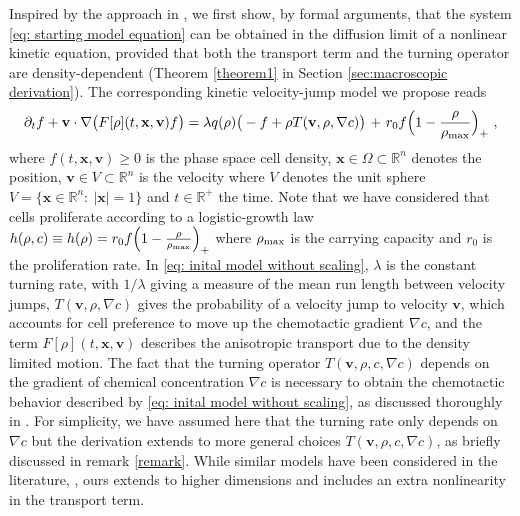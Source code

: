 \documentclass{aims} %
\theoremstyle{definition}
\begin{document}
{Inspired by the approach in \cite{othmer2000diffusion,othmer2002diffusion}, we first show, by formal arguments, that the system \eqref{eq: starting model equation} can be obtained in the diffusion limit of a nonlinear kinetic equation, provided that both the transport term and the turning operator are density-dependent { (Theorem \ref{theorem1} in Section \ref{sec:macroscopic derivation})}. The corresponding kinetic velocity-jump model we propose reads 
\begin{equation}
    \partial_t f+\mathbf{v}\cdot \nabla \big(F[\rho](t,\mathbf{x},\mathbf{v}) f\big)= \lambda q(\rho)\big(-f+\rho T(\mathbf{v},\rho,\nabla c)\big) {\ +\ r_0f\Bigl(1-\frac{\rho}{\rho_{\textnormal{max}}} \Bigr)_+}\ ,\label{eq: inital model without scaling}
\end{equation} where $f(t,\mathbf{x},\mathbf{v}) \geq 0$ is the phase space cell density,  $\mathbf{x}\in \Omega \subset \mathbb{R}^n$ denotes the position, $\mathbf{v} \in V \subset \mathbb{R}^n$ is the velocity where $V$ denotes the unit sphere  $V=\{\mathbf{x}\in\mathbb{R}^n:\ |\mathbf{x}|=1 \}$ and $t \in \mathbb{R}^+$ the time. {Note that we have considered that cells proliferate according to a logistic-growth law $h(\rho,c) \equiv h(\rho) =  r_0f\Bigl(1-\frac{\rho}{\rho_{\textnormal{max}}} \Bigr)_+$ where $\rho_{\textnormal{max}}$ is the carrying capacity and $r_0$ is the proliferation rate.} In \eqref{eq: inital model without scaling}, $\lambda$ is the constant turning rate, with $1/\lambda$ giving a measure of the mean run length between velocity jumps, $T(\mathbf{v},\rho,\nabla c)$ gives the probability of a velocity jump to velocity $\mathbf{v}$, which accounts for cell preference to move up the chemotactic gradient $\nabla c$, and the term $F[\rho](t,\mathbf{x},\mathbf{v})$ describes the anisotropic transport due to the density limited motion. The fact that the turning operator $T(\mathbf{v},\rho,c,\nabla c)$ depends on the gradient of chemical concentration $\nabla c$ is necessary to obtain the chemotactic behavior described by \eqref{eq: inital model without scaling}, as discussed thoroughly in \cite{othmer2002diffusion}. For simplicity, we have assumed here that the turning rate only depends on $\nabla c$ but the derivation extends to more general choices $T(\mathbf{v},\rho,c,\nabla c)$, as briefly discussed in remark \ref{remark}. While similar models have been considered in the literature,  \cite{othmer2000diffusion,othmer2002diffusion}, ours extends to higher dimensions and includes an extra nonlinearity in the transport term.

}
\end{document}
